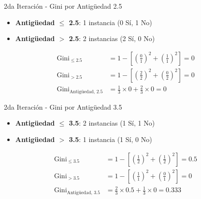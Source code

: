 \documentclass{beamer}
\begin{document}
\begin{frame}{2da Iteración - Gini por Antigüedad 2.5}
    \begin{itemize}
        \item \textbf{Antigüedad $\leq$ 2.5}: 1 instancia (0 Sí, 1 No)
        \item \textbf{Antigüedad $>$ 2.5}: 2 instancias (2 Sí, 0 No)
    \end{itemize}
    
    \vspace{0.5em}
    
    \begin{align*}
        \mathrm{Gini}_{\leq 2.5} &= 1 - \left[\left(\tfrac{0}{1}\right)^2 + \left(\tfrac{1}{1}\right)^2\right] = 0 \\
        \mathrm{Gini}_{> 2.5} &= 1 - \left[\left(\tfrac{2}{2}\right)^2 + \left(\tfrac{0}{2}\right)^2\right] = 0 \\
        \mathrm{Gini}_{\text{Antigüedad, 2.5}} &= \tfrac{1}{3}\times0 + \tfrac{2}{3}\times0 = 0
    \end{align*}
\end{frame}

\begin{frame}{2da Iteración - Gini por Antigüedad 3.5}
    \begin{itemize}
        \item \textbf{Antigüedad $\leq$ 3.5}: 2 instancias (1 Sí, 1 No)
        \item \textbf{Antigüedad $>$ 3.5}: 1 instancia (1 Sí, 0 No)
    \end{itemize}
    
    \vspace{0.5em}
    
    \begin{align*}
        \mathrm{Gini}_{\leq 3.5} &= 1 - \left[\left(\tfrac{1}{2}\right)^2 + \left(\tfrac{1}{2}\right)^2\right] = 0.5 \\
        \mathrm{Gini}_{> 3.5} &= 1 - \left[\left(\tfrac{1}{1}\right)^2 + \left(\tfrac{0}{1}\right)^2\right] = 0 \\
        \mathrm{Gini}_{\text{Antigüedad, 3.5}} &= \tfrac{2}{3}\times0.5 + \tfrac{1}{3}\times0 = 0.333
    \end{align*}
\end{frame}
\end{document}
